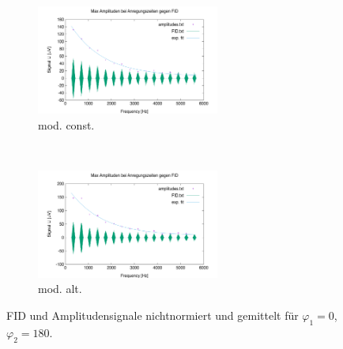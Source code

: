 \documentclass{article}
\begin{document}
        \begin{figure}[H]
            \centering
            \begin{subfigure}[b]{0.4\textwidth}
                \centering
                \includegraphics[width=6cm]{../Bilddateien/10/CPMG-0-180-constant-avg.png}
                \caption{mod. const.}
                \label{fig:CPMG-0-180-constant-avg}
            \end{subfigure}
            \
            \begin{subfigure}[b]{0.4\textwidth}
                \centering
                \includegraphics[width=6cm]{../Bilddateien/10/CPMG-0-180-alternating-avg.png}
                \caption{mod. alt.}
                \label{fig:CPMG-0-180-alternating-avg}
            \end{subfigure}
            \caption{FID und Amplitudensignale nichtnormiert und gemittelt für $\varphi_1 = 0$, $\varphi_2 = 180$.}
            \label{fig:CPMG-0-180-avg}
        \end{figure}
\end{document}
